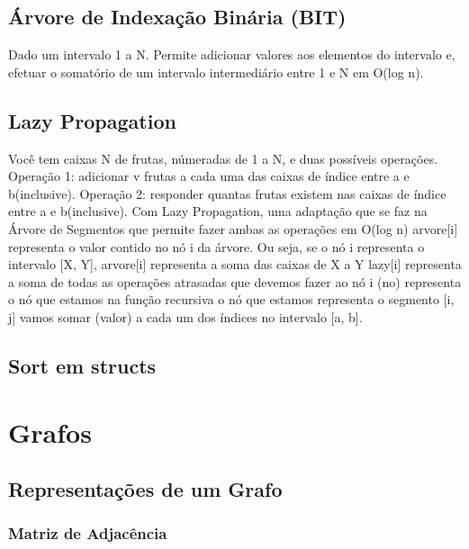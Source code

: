 \documentclass[a4paper,12pt]{article}
\begin{document}
\subsection{Árvore de Indexação Binária (BIT)}
\indent Dado um intervalo 1 a N. Permite adicionar valores aos elementos do intervalo e, efetuar o somatório de um intervalo intermediário entre 1 e N em O(log n).

\subsection{Lazy Propagation}
\indent Você tem caixas N de frutas, númeradas de 1 a N, e duas possíveis operações.
\newline Operação 1: adicionar v frutas a cada uma das caixas de índice entre a e b(inclusive).
\newline Operação 2: responder quantas frutas existem nas caixas de índice entre a e b(inclusive).
\newline Com Lazy Propagation, uma adaptação que se faz na Árvore de Segmentos que permite fazer ambas as operações em O(log n) arvore[i] representa o valor contido no nó i da árvore.
\newline Ou seja, se o nó i representa o intervalo [X, Y], arvore[i] representa a soma das caixas de X a Y lazy[i] representa a soma de todas as operações atrasadas que devemos fazer ao nó i (no) representa o nó que estamos na função recursiva o nó que estamos representa o segmento [i, j] vamos somar (valor) a cada um dos índices no intervalo [a, b].

\subsection{Sort em structs}

\newpage
\section{Grafos}
\subsection{Representações de um Grafo}
\subsubsection{Matriz de Adjacência}
\end{document}

